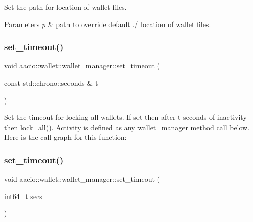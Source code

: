 Set the path for location of wallet files. 
\begin{DoxyParams}{Parameters}
{\em p} & path to override default ./ location of wallet files. \\
\hline
\end{DoxyParams}
\mbox{\label{classaacio_1_1wallet_1_1wallet__manager_a0c90d0e8e821ca501a293b4aaa8fe6f2}} 
\subsubsection{\texorpdfstring{set\+\_\+timeout()}{set\_timeout()}\hspace{0.1cm}{\footnotesize\ttfamily [1/2]}}
{\footnotesize\ttfamily void aacio\+::wallet\+::wallet\+\_\+manager\+::set\+\_\+timeout (\begin{DoxyParamCaption}\item[{const std\+::chrono\+::seconds \&}]{t }\end{DoxyParamCaption})}

Set the timeout for locking all wallets. If set then after t seconds of inactivity then \mbox{\hyperlink{classaacio_1_1wallet_1_1wallet__manager_a9a428038f33268fddfd05b831fee3170}{lock\+\_\+all()}}. Activity is defined as any \mbox{\hyperlink{classaacio_1_1wallet_1_1wallet__manager}{wallet\+\_\+manager}} method call below. Here is the call graph for this function\+:
\mbox{\label{classaacio_1_1wallet_1_1wallet__manager_a13796a3bd3609d3ffb6ee24fa597e403}} 
\subsubsection{\texorpdfstring{set\+\_\+timeout()}{set\_timeout()}\hspace{0.1cm}{\footnotesize\ttfamily [2/2]}}
{\footnotesize\ttfamily void aacio\+::wallet\+::wallet\+\_\+manager\+::set\+\_\+timeout (\begin{DoxyParamCaption}\item[{int64\+\_\+t}]{secs }\end{DoxyParamCaption})\hspace{0.3cm}{\ttfamily [inline]}}


